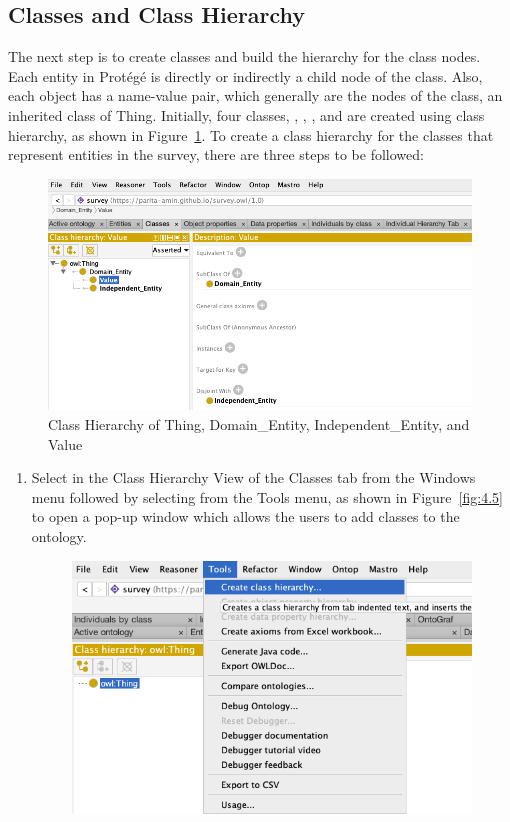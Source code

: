 \begin{doublespace}
\subsection{Classes and Class Hierarchy}
\par The next step is to create classes and build the hierarchy for the class nodes. Each entity in Protégé is directly or indirectly a child node of the  class. Also, each object has a name-value pair, which generally are the nodes of the  class, an inherited class of Thing. Initially, four classes, , , , and  are created using class hierarchy, as shown in Figure~\ref{fig:4.4}. To create a class hierarchy for the classes that represent entities in the survey, there are three steps to be followed:
\begin{figure}[htp]
    \centering
    \includegraphics[width=15cm]{images/ch4/Figure4.png}
    \caption{Class Hierarchy of Thing, Domain\_Entity, Independent\_Entity, and Value}
    \label{fig:4.4}
\end{figure}
\begin{enumerate}
    \item Select  in the Class Hierarchy View of the Classes tab from the Windows menu followed by selecting  from the Tools menu, as shown in Figure~\ref{fig:4.5} to open a  pop-up window which allows the users to add classes to the ontology.
    \begin{figure}[htp]
    \centering
    \includegraphics[width=15cm]{images/ch4/Figure5.png}

\end{figure}
\end{enumerate}
\end{doublespace}
